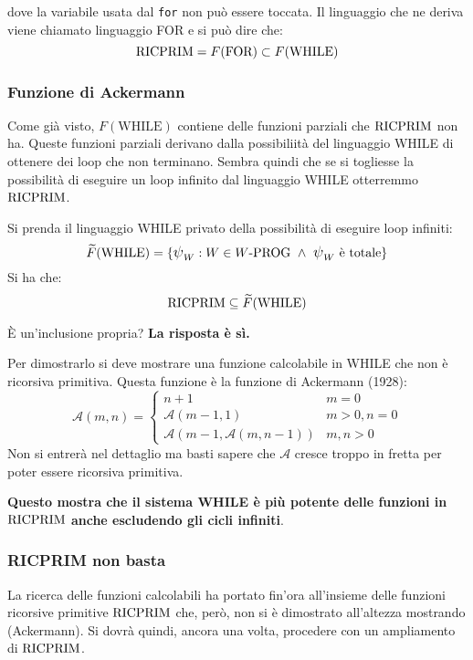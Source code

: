 dove la variabile usata dal \texttt{for} non può essere toccata. Il linguaggio che ne deriva
viene chiamato linguaggio FOR e si può dire che:
$$ \text{RICPRIM} = F(\text{FOR}) \subset F(\text{WHILE}) $$

\subsubsection{Funzione di Ackermann}
Come già visto, $F(\text{WHILE})$ contiene delle funzioni parziali che $\text{RICPRIM}$ non ha.
Queste funzioni parziali derivano dalla possibiliità del linguaggio WHILE di ottenere dei
loop che non terminano. Sembra quindi che se si togliesse la possibilità di eseguire un loop
infinito dal linguaggio WHILE otterremmo $\text{RICPRIM}$.

Si prenda il linguaggio WHILE privato della possibilità di eseguire loop infiniti:
$$ \widetilde{F}(\text{WHILE}) = 
    \{\semWHILE_W:W\in W\text{-PROG}\ \wedge\ \semWHILE_W\text{ è totale}\} $$
Si ha che:
$$ \text{RICPRIM}\subseteq\widetilde{F}(\text{WHILE}) $$

È un'inclusione propria? \textbf{La risposta è sì.}

Per dimostrarlo si deve mostrare una funzione calcolabile in WHILE che non è ricorsiva primitiva.
Questa funzione è la funzione di Ackermann (1928):
$$ \mathscr{A}(m,n) = \begin{cases}
    n+1 & m=0\\
    \mathscr{A}(m-1,1) & m>0,n=0\\
    \mathscr{A}(m-1,\mathscr{A}(m,n-1)) & m,n>0
\end{cases} $$
Non si entrerà nel dettaglio ma basti sapere che $\mathscr{A}$ cresce troppo in fretta per poter
essere ricorsiva primitiva.

\textbf{Questo mostra che il sistema WHILE è più potente delle funzioni in $\text{RICPRIM}$ anche
escludendo gli  cicli infiniti}.

\subsubsection{RICPRIM non basta}
La ricerca delle funzioni calcolabili ha portato fin'ora all'insieme delle funzioni ricorsive
primitive $\text{RICPRIM}$ che, però, non si è dimostrato all'altezza mostrando 
(Ackermann). Si dovrà quindi, ancora una volta, procedere con un ampliamento di $\text{RICPRIM}$.

\begin{center}
    
\end{center}
\vspace{1em}

